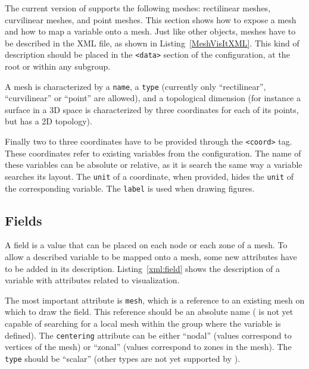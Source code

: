 The current version of \Damaris{} supports the following meshes:
rectilinear meshes, curvilinear meshes, and point meshes. This section shows how to expose
a mesh and how to map a variable onto a mesh.
Just like other \Damaris{} objects, meshes have to be described in the XML file, as shown
in Listing~\ref{MeshVisItXML}. This kind of description should be placed in the \texttt{<data>} section
of the configuration, at the root or within any subgroup.

\noindent\begin{minipage}{\textwidth}
\vspace{0.5cm}

\end{minipage}

A mesh is characterized by a \texttt{name}, a \texttt{type} (currently only ``rectilinear'', ``curvilinear'' or
``point'' are allowed), and a topological dimension (for instance a surface in a 3D space is characterized by three
coordinates for each of its points, but has a 2D topology).

Finally two to three coordinates have to be provided through the \texttt{<coord>} tag. 
These coordinates refer to existing variables from the configuration.
The name of these variables can be absolute or relative, as it is search the same way a variable searches
its layout. The \texttt{unit} of a coordinate, when provided, hides the \texttt{unit} of the corresponding variable.
The \texttt{label} is used when drawing figures.

\subsection{Fields}

A field is a value that can be placed on each node or each zone of a mesh.
To allow a described variable to be mapped onto a mesh, some new attributes have to be added in its description.
Listing~\ref{xml:field} shows the description of a variable with attributes related to visualization.

\noindent\begin{minipage}{\textwidth}
\vspace{0.5cm}

\end{minipage}

The most important attribute is \texttt{mesh}, which is a reference to an existing mesh on which
to draw the field. This reference should be an absolute name (\Damaris{} is not yet capable of searching
for a local mesh within the group where the variable is defined). 
The \texttt{centering} attribute can be either ``nodal'' (values correspond to vertices 
of the mesh) or ``zonal'' (values correspond to zones in the mesh). The \texttt{type} should be
``scalar'' (other types are not yet supported by \Damaris).

